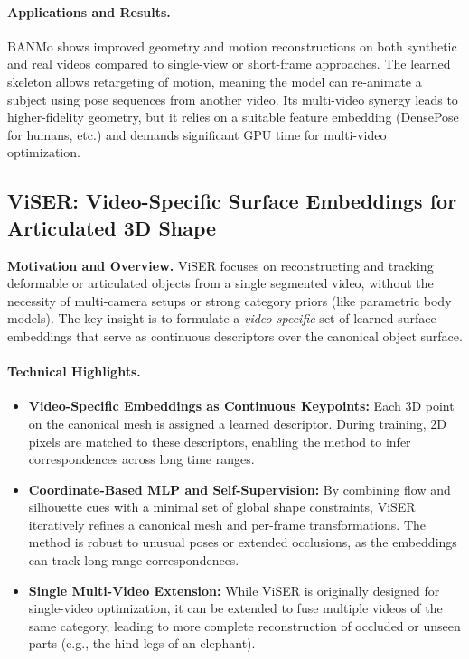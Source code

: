 \documentclass[11pt]{article}
\begin{document}
\paragraph{Applications and Results.}
BANMo shows improved geometry and motion reconstructions on both synthetic and real videos compared to single-view or short-frame approaches. The learned skeleton allows retargeting of motion, meaning the model can re-animate a subject using pose sequences from another video. Its multi-video synergy leads to higher-fidelity geometry, but it relies on a suitable feature embedding (DensePose for humans, etc.) and demands significant GPU time for multi-video optimization.

\subsection{ViSER: Video-Specific Surface Embeddings for Articulated 3D Shape~\cite{yang2021viser}}
\textbf{Motivation and Overview.}
ViSER focuses on reconstructing and tracking deformable or articulated objects from a single segmented video, without the necessity of multi-camera setups or strong category priors (like parametric body models). The key insight is to formulate a \emph{video-specific} set of learned surface embeddings that serve as continuous descriptors over the canonical object surface.

\paragraph{Technical Highlights.}
\begin{itemize}
    \item \textbf{Video-Specific Embeddings as Continuous Keypoints:} Each 3D point on the canonical mesh is assigned a learned descriptor. During training, 2D pixels are matched to these descriptors, enabling the method to infer correspondences across long time ranges.
    \item \textbf{Coordinate-Based MLP and Self-Supervision:} By combining flow and silhouette cues with a minimal set of global shape constraints, ViSER iteratively refines a canonical mesh and per-frame transformations. The method is robust to unusual poses or extended occlusions, as the embeddings can track long-range correspondences.
    \item \textbf{Single \vs Multi-Video Extension:} While ViSER is originally designed for single-video optimization, it can be extended to fuse multiple videos of the same category, leading to more complete reconstruction of occluded or unseen parts (e.g., the hind legs of an elephant).
\end{itemize}
\end{document}
